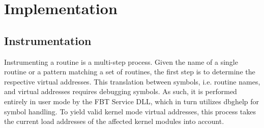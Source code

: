 



	
\chapter{Implementation}
\label{sec:Implementation}

\section{Instrumentation}
Instrumenting a routine is a multi-step process. Given the name of a single routine
or a pattern matching a set of routines, the first step is to determine 
the respective virtual addresses. This translation between symbols, i.e. routine names,
and virtual addresses requires debugging symbols. As such, it is performed
entirely in user mode by the FBT Service DLL, which in turn utilizes dbghelp 
for symbol handling. To yield valid kernel mode virtual addresses, this process
takes the current load addresses of the affected kernel modules into account. 


